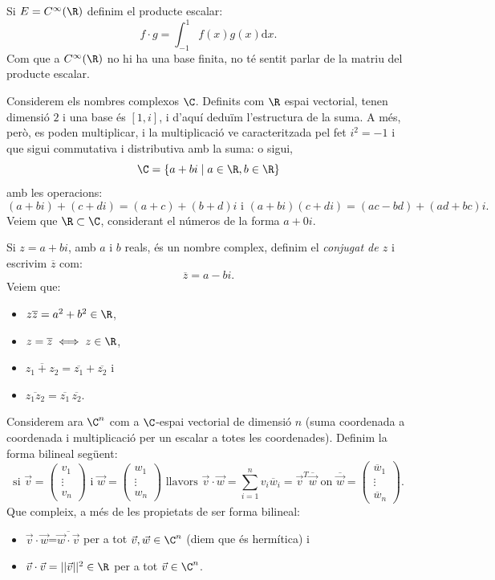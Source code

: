\begin{exemple}
Si $E=C^\infty(\R)$ definim el producte escalar:
\[
f\cdot g = \int_{-1}^1 f(x)g(x)\mathrm{d}x .
\]
Com que a $C^\infty(\R)$ no hi ha una base finita, no té sentit parlar de la matriu del producte escalar.
\end{exemple}

\begin{exemple}\label{exemple:complexos}
Considerem els nombres complexos $\C$. Definits com $\R$ espai vectorial, tenen dimensió $2$ i una base és $[1,i]$, i d'aquí deduïm l'estructura de la suma. A més, però, es poden multiplicar,  i la multiplicació ve caracteritzada pel fet $i^2=-1$ i que sigui commutativa i distributiva amb la suma: o sigui,
\[
\C = \{ a + bi \mid a \in\R, b \in\R \}
\]
amb les operacions:
\[
(a+bi)+(c+di)=(a+c)+(b+d)i \text{ i } (a+bi)(c+di)=(ac-bd)+(ad+bc) i .
\]
Veiem que $\R\subset \C$, considerant el números de la forma $a+0i$.

Si $z=a+bi$, amb $a$ i $b$ reals, és un nombre complex, definim el \emph{conjugat de $z$} i escrivim $\overline z$ com:
\[
\overline z = a-bi .
\]
Veiem que:
\begin{itemize}
    \item $z \overline z=a^2+b^2\in \R$, 
    \item $z=\overline{z} \iff z\in\R$,
    \item $\overline{z_1 + z_2}=\overline{z_1}+\overline{z_2}$ i
    \item $\overline{z_1 z_2}=\overline{z_1}\, \overline{z_2}$.
\end{itemize}

Considerem ara $\C^n$ com a $\C$-espai vectorial de dimensió $n$ (suma coordenada a coordenada i multiplicació per un escalar a totes les coordenades). Definim la forma bilineal següent:
\[
\text{si }
\vec v=\begin{pmatrix}
v_1 \\ \vdots \\ v_n
\end{pmatrix}
\text{ i }
\vec w=\begin{pmatrix}
w_1 \\ \vdots \\ w_n
\end{pmatrix}
\text{ llavors }
\vec v\cdot \vec w= \sum_{i=1}^n v_i\overline{w}_i=\vec v^T \overline{\vec w} \text{ on }
\overline{\vec w}=\begin{pmatrix}
\overline w_1 \\ \vdots \\ \overline w_n
\end{pmatrix}.
\]
Que compleix, a més de les propietats de ser forma bilineal:
\begin{itemize}
    \item $\vec v\cdot \vec w$=$\overline{\vec w\cdot \vec v}$ per a tot $\vec v,\vec w\in \C^n$ (diem que és hermítica) i
    \item $\vec v\cdot \vec v=||\vec v||^2\in \R$ per a tot $\vec v\in\C^n$.
\end{itemize}
\end{exemple}

